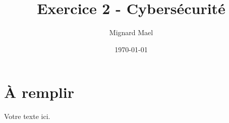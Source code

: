 \documentclass[a4paper,12pt]{article}
\title{Exercice 2 - Cybersécurité}
\author{Mignard Mael}
\date{\today}
\begin{document}
\maketitle

\section{À remplir}

Votre texte ici.
\end{document}
